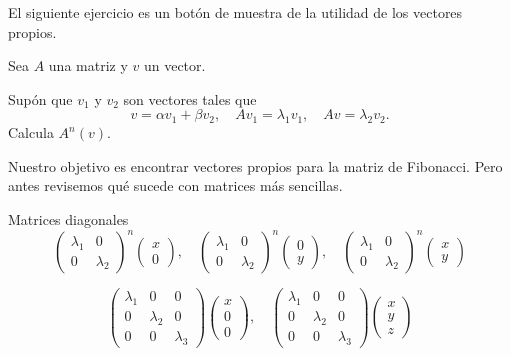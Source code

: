 El siguiente ejercicio es un botón de muestra de la utilidad de los vectores propios.

\begin{ejercicio}
Sea $A$ una matriz y $v$ un vector. 

Supón que $v_1$ y $v_2$ son vectores tales que $$v=\alpha v_1+\beta v_2,\quad Av_1=\lambda_1 v_1,\quad Av=\lambda_2 v_2.$$ Calcula $A^n(v)$. 
\end{ejercicio}


Nuestro objetivo es encontrar vectores propios para la matriz de Fibonacci. Pero antes revisemos qué sucede con matrices más sencillas.

\begin{ejercicio} Matrices diagonales
$$
\left(\begin{array}{cc}
\lambda_1&0 \\
0&\lambda_2
\end{array}\right)^n
\left(\begin{array}{c}
x \\
0
\end{array}\right),
\quad
\left(\begin{array}{cc}
\lambda_1&0 \\
0&\lambda_2
\end{array}\right)^n
\left(\begin{array}{c}
0 \\
y
\end{array}\right),
\quad
\left(\begin{array}{cc}
\lambda_1&0 \\
0&\lambda_2
\end{array}\right)^n
\left(\begin{array}{c}
x \\
y
\end{array}\right)
$$

$$\left(\begin{array}{ccc}
\lambda_1&0&0 \\
0&\lambda_2&0 \\
0&0&\lambda_3
\end{array}\right)
\left(\begin{array}{c}
x \\
0 \\
0
\end{array}\right),
\quad 
\left(\begin{array}{ccc}
\lambda_1&0&0 \\
0&\lambda_2&0 \\
0&0&\lambda_3
\end{array}\right)
\left(\begin{array}{c}
x \\
y \\
z
\end{array}\right)
$$

\end{ejercicio}

